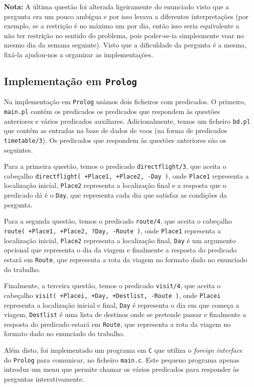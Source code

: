 \documentclass[12pt,a4paper,oneside]{article}
\begin{document}
\textbf{Nota:} A última questão foi alterada ligeiramente do enunciado
visto que a pergunta era um pouco ambígua e por isso levava a
diferentes interpretações (por exemplo, se a restrição é no máximo um
por dia, então isso seria equivalente a não ter restrição no sentido
do problema, pois poder-se-ia simplesmente voar no mesmo dia da semana
seguinte). Visto que a dificuldade da pergunta é a mesma, fixá-la
ajudou-nos a organizar as implementações.

\subsection{Implementação em \texttt{Prolog}}

Na implementação em \texttt{Prolog} usámos dois ficheiros com
predicados. O primeiro, \texttt{main.pl} contém os predicados os
predicados que respondem às questões anteriores e vários predicados
auxiliares. Adicionalmente, temos um ficheiro \texttt{bd.pl} que
contém as entradas na base de dados de voos (na forma de predicados
\texttt{timetable/3}). Os predicados que respondem às questões
anteriores são os seguintes.

Para a primeira questão, temos o predicado \texttt{directflight/3}, que
aceita o cabeçalho \texttt{directflight( +Place1, +Place2, -Day )}, onde
\texttt{Place1} representa a localização inicial, \texttt{Place2}
representa a localização final e a resposta que o predicado dá é o
\texttt{Day}, que representa cada dia que satisfaz as condições da
pergunta.

Para a segunda questão, temos o predicado \texttt{route/4}, que aceita
o cabeçalho \texttt{route( +Place1, +Place2, ?Day, -Route )}, onde
\texttt{Place1} representa a localização inicial, \texttt{Place2}
representa a localização final, \texttt{Day} é um argumento opcional
que representa o dia da viagem e finalmente a resposta do predicado
estará em \texttt{Route}, que representa a rota da viagem no formato
dado no enunciado do trabalho.

Finalmente, a terceira questão, temos o predicado \texttt{visit/4},
que aceita o cabeçalho \texttt{visit( +Placei, +Day, +Destlist, -Route
  )}, onde \texttt{Placei} representa a localização inicial e final,
\texttt{Day} é representa o dia em que começa a viagem,
\texttt{Destlist} é uma lista de destinos onde se pretende passar e
finalmente a resposta do predicado estará em \texttt{Route}, que
representa a rota da viagem no formato dado no enunciado do trabalho.

Além disto, foi implementado um programa em \texttt{C} que utiliza o
\textit{foreign interface} do \texttt{Prolog} \cite{swi:2015} para
comunicar, no ficheiro \texttt{main.c}. Este pequeno programa apenas
introduz um menu que permite chamar os vários predicados para responder
às perguntas interativamente.
\end{document}
